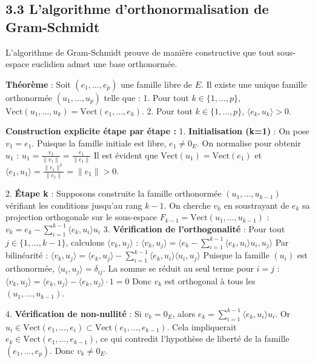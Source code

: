 \documentclass{report}
\begin{document}
\subsection*{3.3 L'algorithme d'orthonormalisation de Gram-Schmidt}

L'algorithme de Gram-Schmidt prouve de manière constructive que tout sous-espace euclidien admet une base orthonormée.

\textbf{Théorème} :
Soit $(e_1, \ldots, e_p)$ une famille libre de $E$. Il existe une unique famille orthonormée $(u_1, \ldots, u_p)$ telle que :
1. Pour tout $k \in \{1, \ldots, p\}$, $\text{Vect}(u_1, \ldots, u_k) = \text{Vect}(e_1, \ldots, e_k)$.
2. Pour tout $k \in \{1, \ldots, p\}$, $\langle e_k, u_k \rangle > 0$.

\textbf{Construction explicite étape par étape :}
1. \textbf{Initialisation (k=1)} : On pose $v_1 = e_1$. Puisque la famille initiale est libre, $e_1 \neq 0_E$. On normalise pour obtenir $u_1$ :
   $ u_1 = \frac{v_1}{\|v_1\|} = \frac{e_1}{\|e_1\|} $
   Il est évident que $\text{Vect}(u_1) = \text{Vect}(e_1)$ et $\langle e_1, u_1 \rangle = \frac{\|e_1\|^2}{\|e_1\|} = \|e_1\| > 0$.

2. \textbf{Étape k} : Supposons construite la famille orthonormée $(u_1, \ldots, u_{k-1})$ vérifiant les conditions jusqu'au rang $k-1$. On cherche $v_k$ en soustrayant de $e_k$ sa projection orthogonale sur le sous-espace $F_{k-1} = \text{Vect}(u_1, \ldots, u_{k-1})$ :
   $ v_k = e_k - \sum_{i=1}^{k-1} \langle e_k, u_i \rangle u_i $
3. \textbf{Vérification de l'orthogonalité} : Pour tout $j \in \{1, \ldots, k-1\}$, calculons $\langle v_k, u_j \rangle$ :
   $ \langle v_k, u_j \rangle = \langle e_k - \sum_{i=1}^{k-1} \langle e_k, u_i \rangle u_i, u_j \rangle $
   Par bilinéarité :
   $ \langle v_k, u_j \rangle = \langle e_k, u_j \rangle - \sum_{i=1}^{k-1} \langle e_k, u_i \rangle \langle u_i, u_j \rangle $
   Puisque la famille $(u_i)$ est orthonormée, $\langle u_i, u_j \rangle = \delta_{ij}$. La somme se réduit au seul terme pour $i=j$ :
   $ \langle v_k, u_j \rangle = \langle e_k, u_j \rangle - \langle e_k, u_j \rangle \cdot 1 = 0 $
   Donc $v_k$ est orthogonal à tous les $(u_1, \ldots, u_{k-1})$.

4. \textbf{Vérification de non-nullité} : Si $v_k = 0_E$, alors $e_k = \sum_{i=1}^{k-1} \langle e_k, u_i \rangle u_i$. Or $u_i \in \text{Vect}(e_1, \ldots, e_{i}) \subset \text{Vect}(e_1, \ldots, e_{k-1})$. Cela impliquerait $e_k \in \text{Vect}(e_1, \ldots, e_{k-1})$, ce qui contredit l'hypothèse de liberté de la famille $(e_1, \ldots, e_p)$. Donc $v_k \neq 0_E$.
\end{document}
